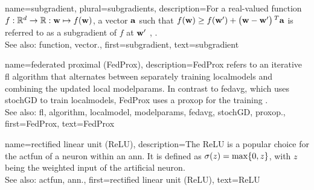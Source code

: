 {name={subgradient}, plural={subgradients},
	description={For a real-valued \gls{function} $f: \mathbb{R}^{d} \rightarrow \mathbb{R}: {\bf w} \mapsto f({\bf w})$, 
		a \gls{vector} ${\bf a}$ such that $f({\bf w}) \geq  f({\bf w}') +\big({\bf w}-{\bf w}' \big)\,^{T} {\bf a}$ is 
		referred to as a subgradient of $f$ at ${\bf w}'$ \cite{BertCvxAnalOpt}, \cite{BertsekasNonLinProgr}.
		\\
		See also: \gls{function}, \gls{vector}.},
	first={subgradient},
	text={subgradient} 
}

{name={federated proximal (FedProx)},
	description={FedProx refers to an iterative \gls{fl} \gls{algorithm} that alternates between separately 
		training \glspl{localmodel} and combining the updated local \gls{modelparams}. In contrast to \gls{fedavg}, which uses 
		\gls{stochGD} to train \glspl{localmodel}, FedProx uses a \gls{proxop} for the training \cite{FedProx2020}.
					\\ 
		See also: \gls{fl}, \gls{algorithm}, \gls{localmodel}, \gls{modelparams}, \gls{fedavg}, \gls{stochGD}, \gls{proxop}.}, 
	first={FedProx}, 
	text={FedProx} 
}

{name={rectified linear unit (ReLU)},
	description={The ReLU is 
		a popular choice for the \gls{actfun} of a neuron within an \gls{ann}. It is defined 
		as $\sigma(z) = \max\{0,z\}$, with $z$ being the weighted input of the artificial 
		neuron.
					\\ 
		See also: \gls{actfun}, \gls{ann}.}, 
	first={rectified linear unit (ReLU)}, 
	text={ReLU} 
}


